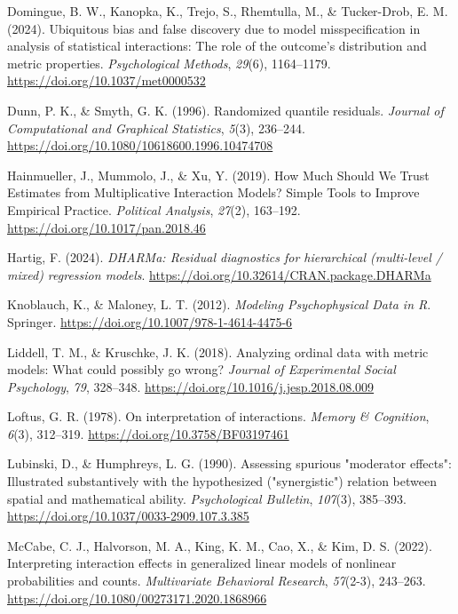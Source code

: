 \documentclass[
  man,
  longtable,
  nolmodern,
  notxfonts,
  notimes,
  colorlinks=true,linkcolor=blue,citecolor=blue,urlcolor=blue]{apa7}
\newlength{\cslhangindent}
\newenvironment{CSLReferences}[2] %
 {\begin{list}{}{%
  \setlength{\itemindent}{0pt}
  \setlength{\leftmargin}{0pt}
  \setlength{\parsep}{0pt}
  \ifodd #1
   \setlength{\leftmargin}{\cslhangindent}
   \setlength{\itemindent}{-1\cslhangindent}
  \fi
  \setlength{\itemsep}{#2\baselineskip}}}
 {\end{list}}
\begin{document}
\begin{CSLReferences}{1}{0}
Domingue, B. W., Kanopka, K., Trejo, S., Rhemtulla, M., \& Tucker-Drob,
E. M. (2024). Ubiquitous bias and false discovery due to model
misspecification in analysis of statistical interactions: The role of
the outcome{'}s distribution and metric properties. \emph{Psychological
Methods}, \emph{29}(6), 1164--1179.
\url{https://doi.org/10.1037/met0000532}

Dunn, P. K., \& Smyth, G. K. (1996). Randomized quantile residuals.
\emph{Journal of Computational and Graphical Statistics}, \emph{5}(3),
236--244. \url{https://doi.org/10.1080/10618600.1996.10474708}

Hainmueller, J., Mummolo, J., \& Xu, Y. (2019). How Much Should We Trust
Estimates from Multiplicative Interaction Models? Simple Tools to
Improve Empirical Practice. \emph{Political Analysis}, \emph{27}(2),
163--192. \url{https://doi.org/10.1017/pan.2018.46}

Hartig, F. (2024). \emph{{DHARMa}: Residual diagnostics for hierarchical
(multi-level / mixed) regression models}.
\url{https://doi.org/10.32614/CRAN.package.DHARMa}

Knoblauch, K., \& Maloney, L. T. (2012). \emph{Modeling Psychophysical
Data in R}. Springer. \url{https://doi.org/10.1007/978-1-4614-4475-6}

Liddell, T. M., \& Kruschke, J. K. (2018). Analyzing ordinal data with
metric models: What could possibly go wrong? \emph{Journal of
Experimental Social Psychology}, \emph{79}, 328--348.
\url{https://doi.org/10.1016/j.jesp.2018.08.009}

Loftus, G. R. (1978). On interpretation of interactions. \emph{Memory \&
Cognition}, \emph{6}(3), 312--319.
\url{https://doi.org/10.3758/BF03197461}

Lubinski, D., \& Humphreys, L. G. (1990). Assessing spurious
{"}moderator effects{"}: Illustrated substantively with the hypothesized
({"}synergistic{"}) relation between spatial and mathematical ability.
\emph{Psychological Bulletin}, \emph{107}(3), 385--393.
\url{https://doi.org/10.1037/0033-2909.107.3.385}

McCabe, C. J., Halvorson, M. A., King, K. M., Cao, X., \& Kim, D. S.
(2022). Interpreting interaction effects in generalized linear models of
nonlinear probabilities and counts. \emph{Multivariate Behavioral
Research}, \emph{57}(2-3), 243--263.
\url{https://doi.org/10.1080/00273171.2020.1868966}


\end{CSLReferences}
\end{document}
